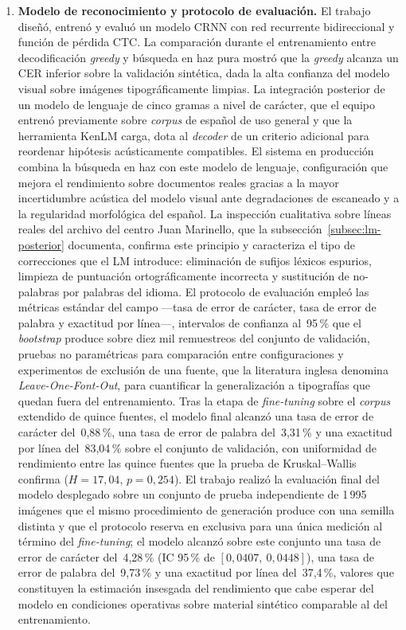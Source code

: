 \begin{enumerate}[leftmargin=*,labelsep=0.5em]
	\item \textbf{Modelo de reconocimiento y protocolo de evaluación.} El trabajo diseñó, entrenó y evaluó un modelo CRNN con red recurrente bidireccional y función de pérdida CTC. La comparación durante el entrenamiento entre decodificación \textit{greedy} y búsqueda en haz pura mostró que la \textit{greedy} alcanza un CER inferior sobre la validación sintética, dada la alta confianza del modelo visual sobre imágenes tipográficamente limpias. La integración posterior de un modelo de lenguaje de cinco gramas a nivel de carácter, que el equipo entrenó previamente sobre \textit{corpus} de español de uso general y que la herramienta KenLM carga, dota al \textit{decoder} de un criterio adicional para reordenar hipótesis acústicamente compatibles. El sistema en producción combina la búsqueda en haz con este modelo de lenguaje, configuración que mejora el rendimiento sobre documentos reales gracias a la mayor incertidumbre acústica del modelo visual ante degradaciones de escaneado y a la regularidad morfológica del español. La inspección cualitativa sobre líneas reales del archivo del centro Juan Marinello, que la subsección~\ref{subsec:lm-posterior} documenta, confirma este principio y caracteriza el tipo de correcciones que el LM introduce: eliminación de sufijos léxicos espurios, limpieza de puntuación ortográficamente incorrecta y sustitución de no-palabras por palabras del idioma. El protocolo de evaluación empleó las métricas estándar del campo —tasa de error de carácter, tasa de error de palabra y exactitud por línea—, intervalos de confianza al~95\,\% que el \textit{bootstrap} produce sobre diez mil remuestreos del conjunto de validación, pruebas no paramétricas para comparación entre configuraciones y experimentos de exclusión de una fuente, que la literatura inglesa denomina \textit{Leave-One-Font-Out}, para cuantificar la generalización a tipografías que quedan fuera del entrenamiento. Tras la etapa de \textit{fine-tuning} sobre el \textit{corpus} extendido de quince fuentes, el modelo final alcanzó una tasa de error de carácter del~0,88\,\%, una tasa de error de palabra del~3,31\,\% y una exactitud por línea del~83,04\,\% sobre el conjunto de validación, con uniformidad de rendimiento entre las quince fuentes que la prueba de Kruskal--Wallis confirma ($H = 17{,}04$, $p = 0{,}254$). El trabajo realizó la evaluación final del modelo desplegado sobre un conjunto de prueba independiente de 1\,995 imágenes que el mismo procedimiento de generación produce con una semilla distinta y que el protocolo reserva en exclusiva para una única medición al término del \textit{fine-tuning}; el modelo alcanzó sobre este conjunto una tasa de error de carácter del~4,28\,\% (IC 95\,\% de $[0{,}0407,\ 0{,}0448]$), una tasa de error de palabra del~9,73\,\% y una exactitud por línea del~37,4\,\%, valores que constituyen la estimación insesgada del rendimiento que cabe esperar del modelo en condiciones operativas sobre material sintético comparable al del entrenamiento.
	

\end{enumerate}
